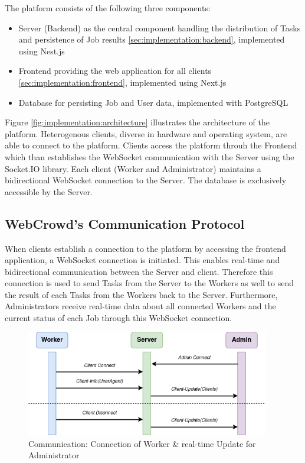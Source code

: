 The platform consists of the following three components:
\begin{itemize}
    \item Server (Backend) as the central component handling the distribution of Tasks and persistence of Job results \ref{sec:implementation:backend}, implemented using Nest.js \cite{methodology:nestjs}
    \item Frontend providing the web application for all clients \ref{sec:implementation:frontend}, implemented using Next.js \cite{methodology:nextjs}
    \item Database for persisting Job and User data, implemented with PostgreSQL \cite{methodology:db}
\end{itemize}

Figure \ref{fig:implementation:architecture} illustrates the architecture of the platform. Heterogenous clients, diverse in hardware and operating system, are able to connect to the platform. Clients access the platform throuh the Frontend which than establishes the WebSocket communication with the Server using the Socket.IO \cite{methodology:websockets2} library. Each client (Worker and Administrator) maintains a bidirectional WebSocket connection to the Server. The database is exclusively accessible by the Server.

\subsection{WebCrowd's Communication Protocol}
\label{subsec:implementation:architecture:communication}
When clients establish a connection to the platform by accessing the frontend application, a WebSocket connection is initiated. This enables real-time and bidirectional communication between the Server and client. Therefore this connection is used to send Tasks from the Server to the Workers as well to send the result of each Tasks from the Workers back to the Server. Furthermore, Administrators receive real-time data about all connected Workers and the current status of each Job through this WebSocket connection.

\begin{figure}[htbp]
    \centering
    \includegraphics[width=0.95\textwidth]{gfx/figures/communication-connection.png}
    \caption{Communication: Connection of Worker \& real-time Update for Administrator}
    \label{fig:implementation:communication1}
\end{figure}

